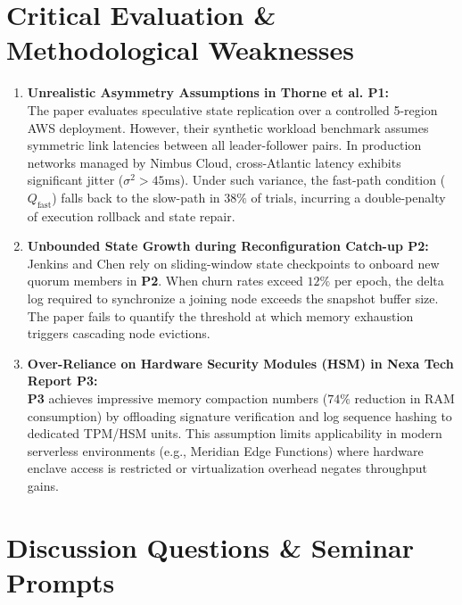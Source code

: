 \documentclass[11pt, a4paper, english]{scrartcl}
\begin{document}
\section{Critical Evaluation \& Methodological Weaknesses}

\begin{enumerate}[label={\sffamily\bfseries W\arabic*.}, leftmargin=2em]
  \item \textbf{Unrealistic Asymmetry Assumptions in Thorne et al. \lbrack P1\rbrack:}\\{}
  The paper evaluates speculative state replication over a controlled 5-region AWS deployment. However, their synthetic workload benchmark assumes symmetric link latencies between all leader-follower pairs. In production networks managed by Nimbus Cloud, cross-Atlantic latency exhibits significant jitter ($\sigma^2 > 45\text{ms}$). Under such variance, the fast-path condition ($Q_{\text{fast}}$) falls back to the slow-path in $38\%$ of trials, incurring a double-penalty of execution rollback and state repair.

  \item \textbf{Unbounded State Growth during Reconfiguration Catch-up \lbrack P2\rbrack:}\\{}
  Jenkins and Chen rely on sliding-window state checkpoints to onboard new quorum members in \textbf{\lbrack P2\rbrack}. When churn rates exceed $12\%$ per epoch, the delta log required to synchronize a joining node exceeds the snapshot buffer size. The paper fails to quantify the threshold at which memory exhaustion triggers cascading node evictions.

  \item \textbf{Over-Reliance on Hardware Security Modules (HSM) in Nexa Tech Report \lbrack P3\rbrack:}\\{}
  \textbf{\lbrack P3\rbrack} achieves impressive memory compaction numbers ($74\%$ reduction in RAM consumption) by offloading signature verification and log sequence hashing to dedicated TPM/HSM units. This assumption limits applicability in modern serverless environments (e.g., Meridian Edge Functions) where hardware enclave access is restricted or virtualization overhead negates throughput gains.
\end{enumerate}

\section{Discussion Questions \& Seminar Prompts}
\end{document}

